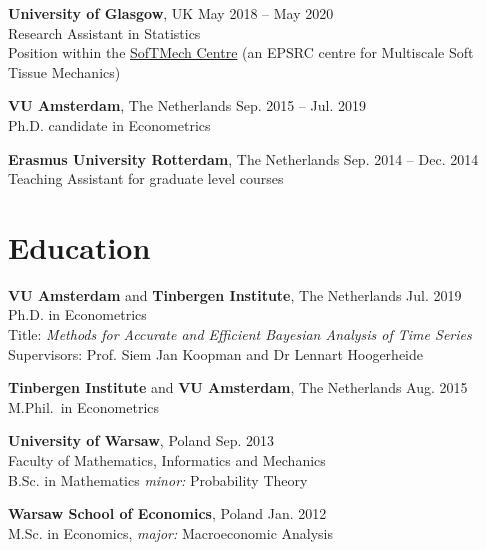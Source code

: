 \documentclass[margin,line]{resume}
\begin{document}
\begin{resume}
    \textbf{University of Glasgow},  UK \hfill  May 2018 -- May 2020\\
	Research Assistant in Statistics\\ 
    Position within the \href{http://softmech.org/}{SofTMech Centre} (an EPSRC centre for Multiscale Soft Tissue Mechanics)
    \vspace{-2mm}
        
    \textbf{VU Amsterdam},  The Netherlands \hfill Sep. 2015 -- Jul. 2019\\
	Ph.D. candidate in Econometrics  
    \vspace{-2mm}
    
    \textbf{Erasmus University Rotterdam},  The Netherlands \hfill Sep. 2014 -- Dec. 2014\\
	Teaching Assistant for graduate level courses\\ 
	
\vspace{-5mm}    
    \section{\mysidestyle Education}
    \textbf{VU Amsterdam} and \textbf{Tinbergen Institute},  The Netherlands \hfill Jul. 2019\\
	Ph.D. in Econometrics\\
	Title: \textit{Methods for Accurate and Efficient Bayesian Analysis of Time Series}\\ 
    Supervisors: Prof. Siem Jan Koopman and Dr Lennart Hoogerheide
\vspace{-2mm}

    \textbf{Tinbergen Institute} and \textbf{VU Amsterdam}, The Netherlands  \hfill Aug. 2015 	\\
	M.Phil.\ in Econometrics
	\vspace{-2mm}

	\textbf{University of Warsaw}, Poland  \hfill Sep. 2013 	\\
	Faculty of Mathematics, Informatics and Mechanics \\B.Sc. in Mathematics		\textit{minor:} Probability Theory 
\vspace{-2mm}

	\textbf{Warsaw School of Economics}, Poland   \hfill  Jan. 2012\\
	M.Sc. in Economics, \textit{major:} Macroeconomic Analysis
\vspace{-2mm}


\end{resume}
\end{document}
